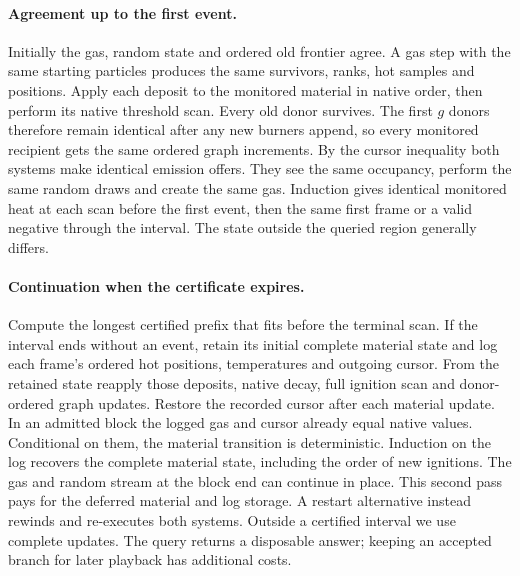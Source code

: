 \documentclass[acmtog,anonymous,review]{acmart}
\begin{document}
\paragraph{Agreement up to the first event.}
Initially the gas, random state and ordered old frontier agree. A gas step with the same starting particles produces the same survivors, ranks, hot samples and positions. Apply each deposit to the monitored material in native order, then perform its native threshold scan. Every old donor survives. The first $g$ donors therefore remain identical after any new burners append, so every monitored recipient gets the same ordered graph increments. By the cursor inequality both systems make identical emission offers. They see the same occupancy, perform the same random draws and create the same gas. Induction gives identical monitored heat at each scan before the first event, then the same first frame or a valid negative through the interval. The state outside the queried region generally differs.

\paragraph{Continuation when the certificate expires.}
Compute the longest certified prefix that fits before the terminal scan. If the interval ends without an event, retain its initial complete material state and log each frame's ordered hot positions, temperatures and outgoing cursor. From the retained state reapply those deposits, native decay, full ignition scan and donor-ordered graph updates. Restore the recorded cursor after each material update. In an admitted block the logged gas and cursor already equal native values. Conditional on them, the material transition is deterministic. Induction on the log recovers the complete material state, including the order of new ignitions. The gas and random stream at the block end can continue in place. This second pass pays for the deferred material and log storage. A restart alternative instead rewinds and re-executes both systems. Outside a certified interval we use complete updates. The query returns a disposable answer; keeping an accepted branch for later playback has additional costs.
\end{document}
